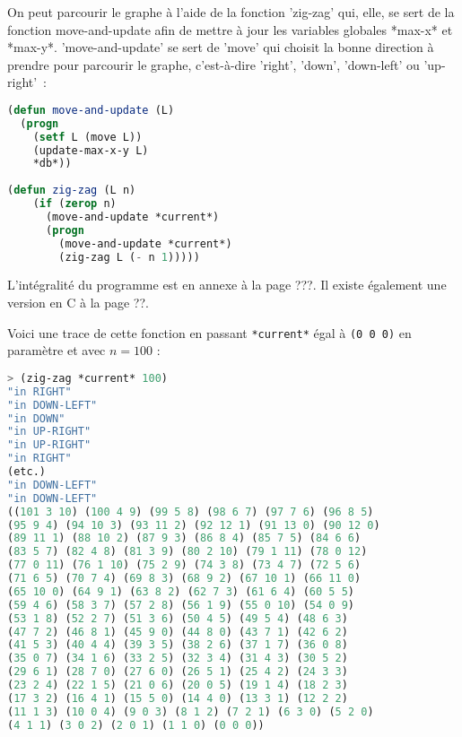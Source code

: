 \documentclass{article}
\begin{document}
On peut parcourir le graphe à l'aide de la fonction 'zig-zag' qui, elle, se sert de la fonction move-and-update afin de mettre à jour les variables globales *max-x* et *max-y*. 'move-and-update' se sert de 'move' qui choisit la bonne direction à prendre pour parcourir le graphe, c'est-à-dire 'right', 'down', 'down-left' ou 'up-right'~:

\begin{lstlisting}[language=Lisp]
(defun move-and-update (L)
  (progn
    (setf L (move L))
    (update-max-x-y L)
    *db*))
 
(defun zig-zag (L n)
    (if (zerop n) 
      (move-and-update *current*)
      (progn
        (move-and-update *current*)
        (zig-zag L (- n 1)))))
\end{lstlisting}



L'intégralité du programme est en annexe à la page ???. Il existe également une version en C à la page ??.

Voici une trace de cette fonction en passant \lstinline!*current*! égal à \lstinline!(0 0 0)! en paramètre et avec $n = 100$ :

\begin{lstlisting}[language=Lisp]
> (zig-zag *current* 100)
"in RIGHT" 
"in DOWN-LEFT" 
"in DOWN" 
"in UP-RIGHT" 
"in UP-RIGHT" 
"in RIGHT" 
(etc.)
"in DOWN-LEFT" 
"in DOWN-LEFT" 
((101 3 10) (100 4 9) (99 5 8) (98 6 7) (97 7 6) (96 8 5) 
(95 9 4) (94 10 3) (93 11 2) (92 12 1) (91 13 0) (90 12 0) 
(89 11 1) (88 10 2) (87 9 3) (86 8 4) (85 7 5) (84 6 6) 
(83 5 7) (82 4 8) (81 3 9) (80 2 10) (79 1 11) (78 0 12) 
(77 0 11) (76 1 10) (75 2 9) (74 3 8) (73 4 7) (72 5 6) 
(71 6 5) (70 7 4) (69 8 3) (68 9 2) (67 10 1) (66 11 0) 
(65 10 0) (64 9 1) (63 8 2) (62 7 3) (61 6 4) (60 5 5) 
(59 4 6) (58 3 7) (57 2 8) (56 1 9) (55 0 10) (54 0 9) 
(53 1 8) (52 2 7) (51 3 6) (50 4 5) (49 5 4) (48 6 3) 
(47 7 2) (46 8 1) (45 9 0) (44 8 0) (43 7 1) (42 6 2) 
(41 5 3) (40 4 4) (39 3 5) (38 2 6) (37 1 7) (36 0 8) 
(35 0 7) (34 1 6) (33 2 5) (32 3 4) (31 4 3) (30 5 2) 
(29 6 1) (28 7 0) (27 6 0) (26 5 1) (25 4 2) (24 3 3) 
(23 2 4) (22 1 5) (21 0 6) (20 0 5) (19 1 4) (18 2 3) 
(17 3 2) (16 4 1) (15 5 0) (14 4 0) (13 3 1) (12 2 2) 
(11 1 3) (10 0 4) (9 0 3) (8 1 2) (7 2 1) (6 3 0) (5 2 0) 
(4 1 1) (3 0 2) (2 0 1) (1 1 0) (0 0 0))
\end{lstlisting}
\end{document}
